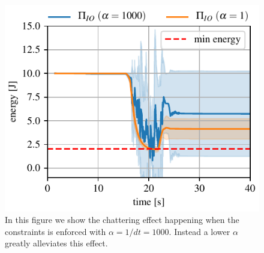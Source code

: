 \begin{figure}[t]
\centering
\includegraphics[width=0.8\columnwidth]{figures/fix_experiment/passivity_coefficient_comparison.pdf}
\caption{In this figure we show the chattering effect happening when the constraints is enforced with $\alpha = 1/dt = 1000$. Instead a lower $\alpha$ greatly alleviates this effect.  }\label{fig:tank_as_zbf}
\end{figure}


